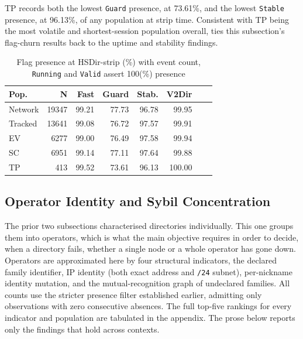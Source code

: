 \documentclass[conference]{IEEEtran}
\begin{document}
TP records both the lowest \texttt{Guard} presence, at 73.61\%, and the lowest \texttt{Stable} presence, at 96.13\%, of any population 
at strip time. Consistent with TP being the most volatile and shortest-session population overall, ties this subsection's flag-churn 
results back to the uptime and stability findings.
 
\begin{table}[htbp]
\caption{Flag presence at HSDir-strip (\%) with event count, \texttt{Running} and \texttt{Valid} assert 100(\%) presence}
\begin{center}
\begin{tabular}{|l|r|r|r|r|r|r|r|}
\hline
\textbf{Pop.} & \textbf{N} & \textbf{Fast} & \textbf{Guard} & \textbf{Stab.} & \textbf{V2Dir} \\
\hline
Network & 19347 & 99.21 & 77.73 & 96.78 & 99.95 \\
\hline
Tracked & 13641 & 99.08 & 76.72 & 97.57 & 99.91 \\
\hline
EV & 6277 & 99.00 & 76.49 & 97.58 & 99.94 \\
\hline
SC & 6951 & 99.14 & 77.11 & 97.64 & 99.88 \\
\hline
TP & 413 & 99.52 & 73.61 & 96.13 & 100.00 \\
\hline
\end{tabular}
\label{tab:flag_churn}
\end{center}
\end{table}

\subsection{Operator Identity and Sybil Concentration}
 
The prior two subsections characterised directories individually. This one groups them into operators, which is what the main objective requires 
in order to decide, when a directory fails, whether a single node or a whole operator has gone down. Operators are approximated here by four 
structural indicators, the declared family identifier, IP identity (both exact address and \texttt{/24} subnet), per-nickname identity mutation, and 
the mutual-recognition graph of undeclared families. All counts use the stricter presence filter established earlier, admitting only observations 
with zero consecutive absences. The full top-five rankings for every indicator and population are tabulated in the appendix. The prose below reports 
only the findings that hold across contexts.
 
\end{document}
